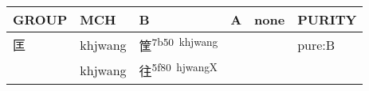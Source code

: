 \documentclass[14pt,a4paper]{scrartcl}
\begin{document}
\begin{longtable}[c]{@{}llllll@{}}
\toprule
\begin{minipage}[b]{0.14\columnwidth}\raggedright\strut
GROUP
\strut\end{minipage} &
\begin{minipage}[b]{0.14\columnwidth}\raggedright\strut
MCH
\strut\end{minipage} &
\begin{minipage}[b]{0.14\columnwidth}\raggedright\strut
B
\strut\end{minipage} &
\begin{minipage}[b]{0.14\columnwidth}\raggedright\strut
A
\strut\end{minipage} &
\begin{minipage}[b]{0.14\columnwidth}\raggedright\strut
none
\strut\end{minipage} &
\begin{minipage}[b]{0.14\columnwidth}\raggedright\strut
PURITY
\strut\end{minipage}\tabularnewline
\midrule
\endhead
\begin{minipage}[t]{0.14\columnwidth}\raggedright\strut
匡
\strut\end{minipage} &
\begin{minipage}[t]{0.14\columnwidth}\raggedright\strut
khjwang
\strut\end{minipage} &
\begin{minipage}[t]{0.14\columnwidth}\raggedright\strut
筐\textsuperscript{7b50~khjwang}
\strut\end{minipage} &
\begin{minipage}[t]{0.14\columnwidth}\raggedright\strut
\strut\end{minipage} &
\begin{minipage}[t]{0.14\columnwidth}\raggedright\strut
\strut\end{minipage} &
\begin{minipage}[t]{0.14\columnwidth}\raggedright\strut
pure:B
\strut\end{minipage}\tabularnewline
\begin{minipage}[t]{0.14\columnwidth}\raggedright\strut
𡉚
\strut\end{minipage} &
\begin{minipage}[t]{0.14\columnwidth}\raggedright\strut
khjwang
\strut\end{minipage} &
\begin{minipage}[t]{0.14\columnwidth}\raggedright\strut
往\textsuperscript{5f80~hjwangX}
\strut\end{minipage} &

\end{longtable}
\end{document}
